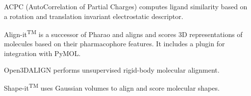 ACPC (AutoCorrelation of Partial Charges) \cite{Berenger_2014} computes ligand similarity based on a rotation and translation invariant electrostatic descriptor.

Align-it\textsuperscript{TM} is a successor of Pharao \cite{Taminau_2008} and aligns and scores 3D representations of molecules based on their pharmacophore features.  It includes a plugin for integration with PyMOL.

Open3DALIGN \cite{Tosco_2011} performs unsupervised rigid-body molecular alignment.

Shape-it\textsuperscript{TM} uses Gaussian volumes to align and score molecular shapes.


